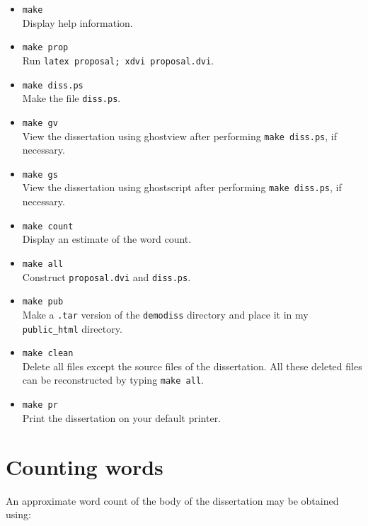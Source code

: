 \documentclass[12pt,twoside,notitlepage]{report}
\begin{document}
\begin{itemize}

\item{\tt make} \\
 Display help information.

\item{\tt make prop} \\
 Run {\tt latex proposal; xdvi proposal.dvi}.

\item{\tt make diss.ps} \\
 Make the file {\tt diss.ps}.

\item{\tt make gv} \\
 View the dissertation using ghostview after performing 
{\tt make diss.ps}, if necessary.

\item{\tt make gs} \\
 View the dissertation using ghostscript after performing 
{\tt make diss.ps}, if necessary.

\item{\tt make count} \\
Display an estimate of the word count.

\item{\tt make all} \\
Construct {\tt proposal.dvi} and {\tt diss.ps}.

\item{\tt make pub} \\ Make a {\tt .tar} version of the {\tt demodiss}
directory and place it in my {\tt public\_html} directory.

\item{\tt make clean} \\ Delete all files except the source files of
the dissertation. All these deleted files can be reconstructed by
typing {\tt make all}.

\item{\tt make pr} \\
Print the dissertation on your default printer.

\end{itemize}


\section{Counting words}

An approximate word count of the body of the dissertation may be
obtained using:
\end{document}
